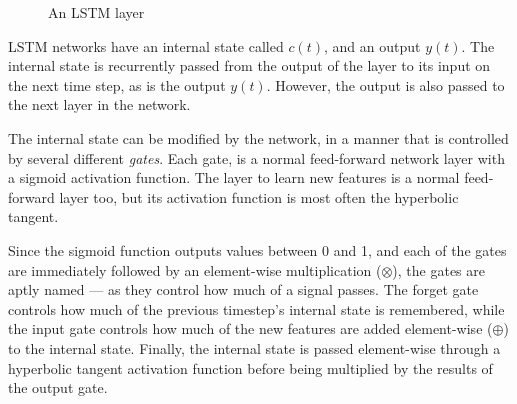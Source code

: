 \begin{figure}[h]
    \caption{An LSTM layer}\label{fig:language-models:lstm-layer}
\end{figure}

LSTM networks have an internal state called $c(t)$, and an output $y(t)$.
The internal state is recurrently passed from the output of the layer to its input on the next time step, as is the output $y(t)$.
However, the output is also passed to the next layer in the network.

The internal state can be modified by the network, in a manner that is controlled by several different \textit{gates}.
Each gate, is a normal feed-forward network layer with a sigmoid activation function.
The layer to learn new features is a normal feed-forward layer too, but its activation function is most often the hyperbolic tangent.

Since the sigmoid function outputs values between 0 and 1, and each of the gates are immediately followed by an element-wise multiplication ($\otimes$), the gates are aptly named --- as they control how much of a signal passes.
The forget gate controls how much of the previous timestep's internal state is remembered, while the input gate controls how much of the new features are added element-wise ($\oplus$) to the internal state.
Finally, the internal state is passed element-wise through a hyperbolic tangent activation function before being multiplied by the results of the output gate.

